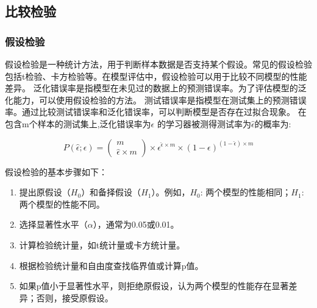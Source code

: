 \subsection{比较检验}
\subsubsection{假设检验}
假设检验是一种统计方法，用于判断样本数据是否支持某个假设。常见的假设检验包括t检验、卡方检验等。在模型评估中，假设检验可以用于比较不同模型的性能差异。
泛化错误率是指模型在未见过的数据上的预测错误率。为了评估模型的泛化能力，可以使用假设检验的方法。
测试错误率是指模型在测试集上的预测错误率。通过比较测试错误率和泛化错误率，可以判断模型是否存在过拟合现象。
在包含m个样本的测试集上,泛化错误率为$\epsilon$ 的学习器被测得测试率为$\hat{\epsilon}$的概率为:

\begin{equation}
    P(\hat{\epsilon};\epsilon) =
    \begin{pmatrix}
        m \\
        \hat{\epsilon}\times m
    \end{pmatrix}
    \times
    \epsilon^{\hat{\epsilon} \times m} \times (1-\epsilon)^{(1-\hat{\epsilon}) \times m}
\end{equation}

假设检验的基本步骤如下：
\begin{enumerate}
    \item 提出原假设（$H_0$）和备择假设（$H_1$）。例如，$H_0$: 两个模型的性能相同；$H_1$: 两个模型的性能不同。
    \item 选择显著性水平（$\alpha$），通常为0.05或0.01。
    \item 计算检验统计量，如t统计量或卡方统计量。
    \item 根据检验统计量和自由度查找临界值或计算p值。
    \item 如果p值小于显著性水平，则拒绝原假设，认为两个模型的性能存在显著差异；否则，接受原假设。
\end{enumerate}

